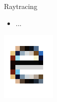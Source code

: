 \documentclass{lug}
\newcommand{\splitslide}[4]{
    \noindent
    \begin{minipage}{#1 \textwidth - #2 }
        #3
    \end{minipage}%
    \hspace{ \dimexpr #2 * 2 \relax }%
    \begin{minipage}{\textwidth - #1 \textwidth - #2 }
        #4
    \end{minipage}
}
\begin{document}
\begin{frame}{Raytracing}
    \splitslide{0.65}{.7em}{
        \small
        \begin{itemize}
            \item ...
        \end{itemize}
    }{
        \includegraphics[width=\textwidth]{graphics/subpixel_e}
    }
\end{frame}
\end{document}

